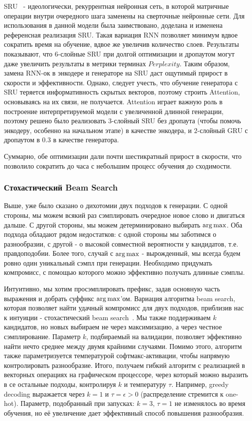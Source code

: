 \documentclass{spbau-diploma}
\begin{document}
SRU~\cite{1709.02755} - идеологически, рекуррентная нейронная сеть, в которой 
матричные операции внутри очередного шага заменены на сверточные нейронные 
сети. Для использования в данной модели была заимствовано, доделана и 
изменена референсная реализация SRU. Такая вариация RNN позволяет минимум 
вдвое сократить время на обучение, вдвое же увеличив количество слоев. 
Результаты показывают, что $6$-слойные SRU при долгой оптимизации и дропаутом 
могут даже увеличить результаты в метрики терминах $Perplexity$. Таким 
образом, замена RNN-ок в энкодере и генераторе на SRU даст ощутимый прирост в 
скорости и эффективности. Однако, следует учесть, что обучение генератора с 
SRU теряется информативность скрытых векторов, поэтому строить Attention, 
основываясь на их связи, не получается. Attention играет важную роль в 
построение интерпретируемой модели с увеличенной длинной генерации, поэтому 
решено было реализовать $3$-слойный SRU без дропаута (чтобы помочь энкодеру, 
особенно на начальном этапе) в качестве энкодера, и $2$-слойный GRU с 
дропаутом в $0.3$ в качестве генератора.

Суммарно, обе оптимизации дали почти шестикратный прирост в скорости,
что позволило сократить до часа с небольшим процесс обучения до сходимости.

\subsubsection{Стохастический Beam Search}
Выше, уже было сказано о дихотомии двух подходов к генерации. С одной стороны,
мы можем всякий раз сэмплировать очередное новое слово и двигаться дальше. С
другой стороны, мы можем детерминировано выбирать $\operatorname*{arg\,max}$. Оба подхода 
обладают рядом недостатков: с одной стороны мы заботимся о разнообразии, с 
другой - о высокой совместной вероятности у кандидатов, т.е. правдоподобии.
Более того, случай с $\operatorname*{arg\,max}$ - вырожденный, мы всегда будем ровно один
уникальный сэмпл при генерации. Необходимо придумать компромисс, с помощью 
которого можно эффективно получать длинные сэмплы.

Интуитивно, мы хотим просэмплировать префикс, задав основную часть выражения и 
добрать суффикс $\operatorname*{arg\,max}$'ом. Вариация алгоритма beam search, которая позволяет
найти удачный компромисс для двух подходов, приблизив нас к интуиции - 
стохастический beam search~\cite{sbeamsearch}. Мы также поддерживаем $k$ 
кандидатов, но новых выбираем не через максимизацию, а через честное 
сэмплирование. Параметр $k$, подбираемый на валидации, позволяет эффективно 
найти нечто среднее между двумя крайними случаями. Помимо этого, алгоритм 
также параметризуется температурой софтмакс-активации, чтобы напрямую 
контролировать разнообразие. Итого, получаем гибкий алгоритм с реализацией в 
векторных операциях на графическом процессоре, через который можно выразить в
се остальные подходы, контролируя $k$ и температуру $\tau$. Например, greedy 
decoding выражается через $k=1$ и $\tau=\epsilon > 0$ (распределение стремится 
к one-hot). Параметр, подобранный при запусках: $k=3$, $\tau=1$ не изменялось 
во время обучения, но её увеличение дает эффективный способ повышения 
разнообразия.
\end{document}
